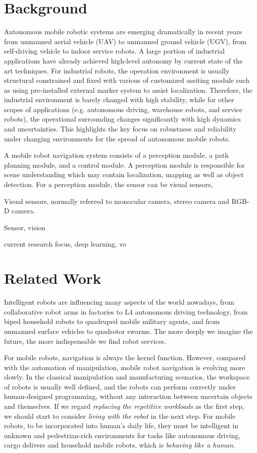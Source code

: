 \section{Background}
Autonomous mobile robotic systems are emerging dramatically in recent years from
unmanned aerial vehicle (UAV) to unmanned ground vehicle (UGV), from self-driving
vehicle to indoor service robots. A large portion of industrial applications have
already achieved high-level autonomy by current state of the art techniques. 
For industrial robots, the operation environment is usually structural constrained 
and fixed with various of customized assiting module such as using pre-installed 
external marker system to assist localization. 
Therefore, the industrial environment is barely changed with high stability, 
while for other scopes of applications (e.g. autonomous driving, warehouse robots,
and service robots), the operational surrounding changes significantly with high dynamics
and uncertainties. This highlights the key focus on robustness and reliability under
changing environments for the spread of autonomous mobile robots. 

A mobile robot navigation system consists of a perception module, a path planning module, and a control module.
A perception module is responsible for scene understanding which may contain localization, mapping as well as 
object detection. For a perception module, the sensor can be visual sensors, 


Visual sensors, normally referred to monocular camera, stereo camera and RGB-D camera. 

Sensor, vision  

current research focus, deep learning, vo 



\section{Related Work}



Intelligent robots are influencing many aspects of the world nowadays, from collaborative robot arms in factories to L4 autonomous driving technology, from biped household robots to quadruped mobile military agents, and from unmanned surface vehicles to quadrotor swarms. The more deeply we imagine the future, the more indispensable we find robot services.

For mobile robots, navigation is always the kernel function. However, compared with the automation of manipulation, mobile robot navigation is evolving more slowly. In the classical manipulation and manufacturing scenarios, the workspace of robots is usually well defined, and the robots can perform correctly under human-designed programming, without any interaction between uncertain objects and themselves. If we regard \textit{replacing the repetitive workloads} as the first step, we should start to consider \textit{living with the robot} in the next step. For mobile robots, to be incorporated into human's daily life, they must be intelligent in unknown and pedestrian-rich environments for tasks like autonomous driving, cargo delivers and household mobile robots, which is \textit{behaving like a human}.

